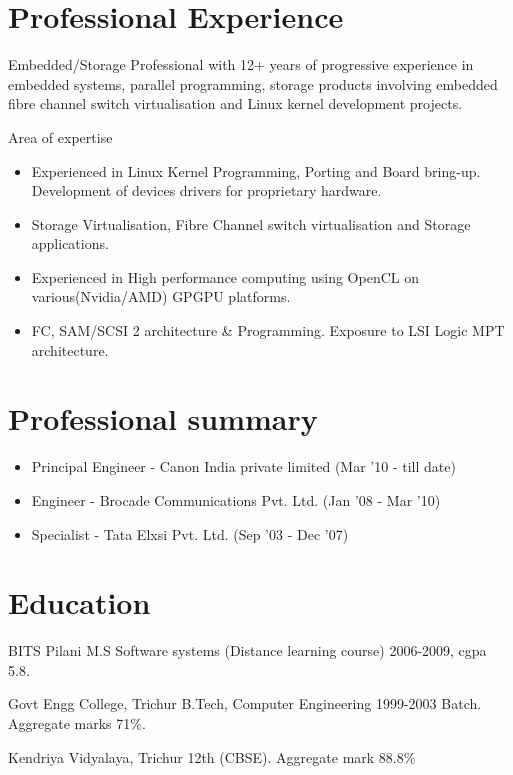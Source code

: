 \begin{resume}

\section{\sc Professional Experience } 
Embedded/Storage Professional with 12+ years of progressive experience in embedded systems, parallel programming, storage products involving embedded fibre channel switch virtualisation and Linux kernel development projects.
 
Area of expertise
\begin{itemize}
\item Experienced in Linux Kernel Programming, Porting and Board bring-up. Development of devices drivers for proprietary hardware.  
\item Storage Virtualisation, Fibre Channel switch virtualisation and Storage applications.
\item Experienced in High performance computing using OpenCL on various(Nvidia/AMD) GPGPU platforms.
\item FC, SAM/SCSI 2 architecture \& Programming. Exposure to LSI Logic MPT architecture.
\end{itemize}

\section{\sc Professional summary}
\begin{itemize}
\renewcommand{\labelitemi}{$\diamond$}
\item Principal Engineer - Canon India private limited (Mar '10 - till date)
\item Engineer           - Brocade Communications Pvt. Ltd. (Jan '08 - Mar '10) 
\item Specialist         - Tata Elxsi Pvt. Ltd. (Sep '03 - Dec '07)
\end{itemize}

\section{\sc Education}
BITS Pilani \newline 
M.S Software systems (Distance learning course) 2006-2009, cgpa 5.8.

Govt Engg College, Trichur \newline
B.Tech, Computer Engineering 1999-2003 Batch. Aggregate marks 71\%. 

Kendriya Vidyalaya, Trichur\newline
12th (CBSE). Aggregate mark 88.8\%


\end{resume}
